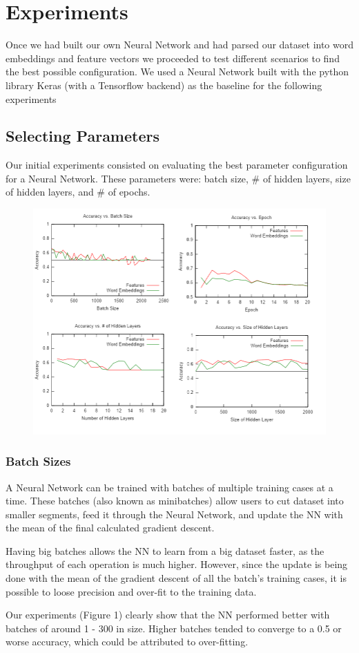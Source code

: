 \documentclass[11pt,onecolumn]{article} %
\begin{document}
\section{Experiments}
Once we had built our own Neural Network and had parsed our dataset into word embeddings and feature vectors we proceeded to test different scenarios to find the best possible configuration. We used a Neural Network built with the python library Keras (with a Tensorflow backend) as the baseline for the following experiments



\subsection{Selecting Parameters}
Our initial experiments consisted on evaluating the best parameter configuration for a Neural Network. These parameters were: batch size, \# of hidden layers, size of hidden layers, and \# of epochs. 
\begin{figure}[t]
\centering
\includegraphics[width=1.1\linewidth]{images/all_in_one}
\caption{}
\label{fig:all_in_one}
\end{figure}

\subsubsection{Batch Sizes}
A Neural Network can be trained with batches of multiple training cases at a time. These batches (also known as minibatches) allow users to cut dataset into smaller segments, feed it through the Neural Network, and update the NN with the mean of the final calculated gradient descent.
\par Having big batches allows the NN to learn from a big dataset faster, as the throughput of each operation is much higher. However, since the update is being done with the mean of the gradient descent of all the batch's training cases, it is possible to loose precision and over-fit to the training data.
\par Our experiments (Figure 1) clearly show that the NN performed better with batches of around 1 - 300 in size. Higher batches tended to converge to a 0.5 or worse accuracy, which could be attributed to over-fitting. 
\end{document}
